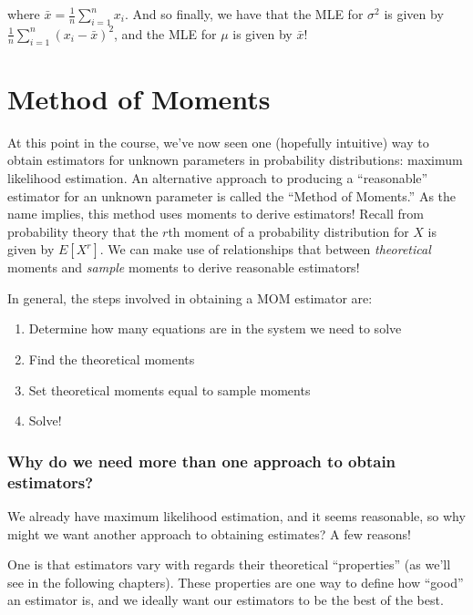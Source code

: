 \documentclass[
  letterpaper,
  DIV=11,
  numbers=noendperiod]{scrreprt}
\begin{document}
where \(\bar{x} = \frac{1}{n} \sum_{i = 1}^n x_i\). And so finally, we
have that the MLE for \(\sigma^2\) is given by
\(\frac{1}{n} \sum_{i = 1}^n (x_i - \bar{x} )^2\), and the MLE for
\(\mu\) is given by \(\bar{x}\)!


\hypertarget{method-of-moments}{%
\chapter{Method of Moments}\label{method-of-moments}}

At this point in the course, we've now seen one (hopefully intuitive)
way to obtain estimators for unknown parameters in probability
distributions: maximum likelihood estimation. An alternative approach to
producing a ``reasonable'' estimator for an unknown parameter is called
the ``Method of Moments.'' As the name implies, this method uses moments
to derive estimators! Recall from probability theory that the \(r\)th
moment of a probability distribution for \(X\) is given by \(E[X^r]\).
We can make use of relationships that between \emph{theoretical} moments
and \emph{sample} moments to derive reasonable estimators!

In general, the steps involved in obtaining a MOM estimator are:

\begin{enumerate}
\def\labelenumi{\arabic{enumi}.}
\item
  Determine how many equations are in the system we need to solve
\item
  Find the theoretical moments
\item
  Set theoretical moments equal to sample moments
\item
  Solve!
\end{enumerate}

\hypertarget{why-do-we-need-more-than-one-approach-to-obtain-estimators}{%
\subsection*{Why do we need more than one approach to obtain
estimators?}\label{why-do-we-need-more-than-one-approach-to-obtain-estimators}}

We already have maximum likelihood estimation, and it seems reasonable,
so why might we want another approach to obtaining estimates? A few
reasons!

One is that estimators vary with regards their theoretical
``properties'' (as we'll see in the following chapters). These
properties are one way to define how ``good'' an estimator is, and we
ideally want our estimators to be the best of the best.
\end{document}
